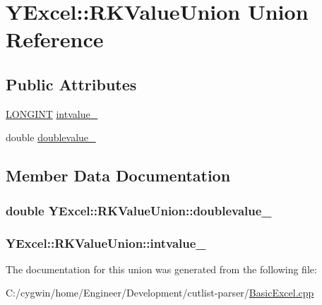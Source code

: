 \hypertarget{union_y_excel_1_1_r_k_value_union}{}\section{Y\+Excel\+:\+:R\+K\+Value\+Union Union Reference}
\label{union_y_excel_1_1_r_k_value_union}
\subsection*{Public Attributes}
\begin{DoxyCompactItemize}
\item 
\hyperlink{_p_lto_q_b_2_basic_excel_8hpp_a41a6a848ac1750ea79579492320f45b6}{L\+O\+N\+G\+I\+N\+T} \hyperlink{union_y_excel_1_1_r_k_value_union_a0391298ffa86fb1dc80faddb7c925aab}{intvalue\+\_\+}
\item 
double \hyperlink{union_y_excel_1_1_r_k_value_union_a33ff90cfb1cd975cebab3962e606997b}{doublevalue\+\_\+}
\end{DoxyCompactItemize}


\subsection{Member Data Documentation}
\hypertarget{union_y_excel_1_1_r_k_value_union_a33ff90cfb1cd975cebab3962e606997b}{}
\subsubsection[{doublevalue\+\_\+}]{\setlength{\rightskip}{0pt plus 5cm}double Y\+Excel\+::\+R\+K\+Value\+Union\+::doublevalue\+\_\+}\label{union_y_excel_1_1_r_k_value_union_a33ff90cfb1cd975cebab3962e606997b}
\hypertarget{union_y_excel_1_1_r_k_value_union_a0391298ffa86fb1dc80faddb7c925aab}{}
\subsubsection[{intvalue\+\_\+}]{ Y\+Excel\+::\+R\+K\+Value\+Union\+::intvalue\+\_\+}\label{union_y_excel_1_1_r_k_value_union_a0391298ffa86fb1dc80faddb7c925aab}


The documentation for this union was generated from the following file\+:\begin{DoxyCompactItemize}
\item 
C\+:/cygwin/home/\+Engineer/\+Development/cutlist-\/parser/\hyperlink{_basic_excel_8cpp}{Basic\+Excel.\+cpp}\end{DoxyCompactItemize}
